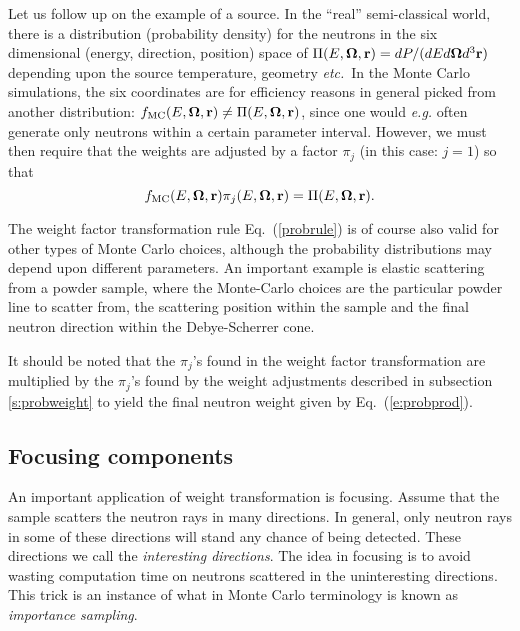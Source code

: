 Let us follow up on the example of a source.
In the ``real'' semi-classical world, there is a distribution
(probability density) for the neutrons in the six dimensional
(energy, direction, position) space of
$\Pi(E,\mbox{\boldmath $\Omega$},{\bf r}) = dP/(dE d\mbox{\boldmath $\Omega$} d^3{\bf r})$ depending upon
the source temperature, geometry {\em etc.}\ In the
Monte Carlo simulations, the six coordinates are for efficiency reasons
in general picked from another distribution:
$f_{\rm MC}(E,\mbox{\boldmath $\Omega$},{\bf r}) \neq \Pi(E, \mbox{\boldmath $\Omega$},{\bf r})$,
since one would {\em e.g.} often generate
only neutrons within a certain parameter interval.
However, we must then require that the weights are adjusted
by a factor $\pi_j$ (in this case: $j=1$) so that
\begin{equation} \label{probrule}
f_{\rm MC}(E,\mbox{\boldmath $\Omega$},{\bf r}) \pi_j(E,\mbox{\boldmath $\Omega$},{\bf r})
 = \Pi(E,\mbox{\boldmath $\Omega$},{\bf r}) .
\end{equation}

The weight factor transformation rule Eq.~(\ref{probrule})
is of course also valid for other types of Monte Carlo choices,
although the probability distributions may depend upon
different parameters. An important example
is elastic scattering from a powder sample,
where the Monte-Carlo choices are the particular powder line to scatter from,
the scattering position within the sample and the final neutron direction
within the Debye-Scherrer cone.

It should be noted that the $\pi_j$'s found in the weight factor
transformation are multiplied by the $\pi_j$'s found by the
weight adjustments described in
subsection \ref{s:probweight} to yield the final neutron
weight given by Eq.~(\ref{e:probprod}).

\subsection{Focusing components}
\label{s:focus}
An important application of weight transformation is focusing.
Assume that the sample scatters the neutron rays in many directions.
In general, only neutron rays in some of these directions will
stand any chance of being detected. These directions we call
the {\em interesting directions}.
The idea in focusing is to avoid wasting computation time on
neutrons scattered in the uninteresting directions.
This trick is an instance of what in Monte Carlo terminology
is known as {\em importance sampling}. %

